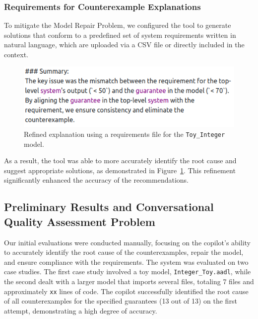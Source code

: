 \subsubsection{Requirements for Counterexample Explanations}

To mitigate the Model Repair Problem, we configured the tool to generate solutions that conform to a predefined set of system requirements written in natural language, which are uploaded via a CSV file or directly included in the context. 

\begin{figure}[t]  
    \centering
    \includegraphics[width=0.95\columnwidth]{REQ-AWARE-REF-high-res.png}  
    \caption{Refined explanation using a requirements file for the \texttt{Toy\_Integer} model.}
    \label{fig:REQ-AWARE-EXPL}
\end{figure}


As a result, the tool was able to more accurately identify the root cause and suggest appropriate solutions, as demonstrated in Figure~\ref{fig:REQ-AWARE-EXPL}.
%
%
This refinement significantly enhanced the accuracy of the recommendations.


\subsection{Preliminary Results and Conversational Quality Assessment Problem}
 
Our initial evaluations were conducted manually, focusing on the copilot's ability to accurately identify the root cause of the counterexamples, repair the model, and ensure compliance with the requirements. The system was evaluated on two case studies. The first case study involved a toy model, \texttt{Integer\_Toy.aadl}, while the second dealt with a larger model that imports several files, totaling 7 files and approximately \texttt{xx} lines of code. The copilot successfully identified the root cause of all counterexamples for the specified guarantees (13 out of 13) on the first attempt, demonstrating a high degree of accuracy.

